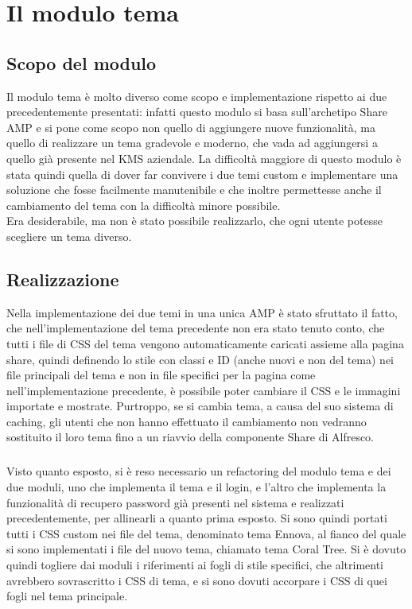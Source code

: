 
\chapter{Il modulo tema}
\label{cap:modulo-tema}

\section{Scopo del modulo}
Il modulo tema è molto diverso come scopo e implementazione rispetto ai due precedentemente presentati: infatti questo modulo si basa sull'archetipo Share AMP e si pone come scopo non quello di aggiungere nuove funzionalità, ma quello di realizzare un tema gradevole e moderno, che vada ad aggiungersi a quello già presente nel \gls{KMS} aziendale. La difficoltà maggiore di questo modulo è stata quindi quella di dover far convivere i due temi custom e implementare una soluzione che fosse facilmente manutenibile e che inoltre permettesse anche il cambiamento del tema con la difficoltà minore possibile.\\
Era desiderabile, ma non è stato possibile realizzarlo, che ogni utente potesse scegliere un tema diverso.
\section{Realizzazione}
Nella implementazione dei due temi in una unica AMP è stato sfruttato il fatto, che nell'implementazione del tema precedente non era stato tenuto conto, che tutti i file di CSS del tema vengono automaticamente caricati assieme alla pagina share, quindi definendo lo stile con classi e ID (anche nuovi e non del tema) nei file principali del tema e non in file specifici per la pagina come nell'implementazione precedente, è possibile poter cambiare il CSS e le immagini importate e mostrate.
Purtroppo, se si cambia tema, a causa del suo sistema di caching, gli utenti che non hanno effettuato il cambiamento non vedranno sostituito il loro tema fino a un riavvio della componente Share di Alfresco.
\paragraph{}Visto quanto esposto, si è reso necessario un refactoring del modulo tema e dei due moduli, uno che implementa il tema e il login, e l'altro che implementa la funzionalità di recupero password già presenti nel sistema e realizzati precedentemente, per allinearli a quanto prima esposto. Si sono quindi portati tutti i CSS custom nei file del tema, denominato tema Ennova, al fianco del quale si sono implementati i file del nuovo tema, chiamato tema Coral Tree. Si è dovuto quindi togliere dai moduli i riferimenti ai fogli di stile specifici, che altrimenti avrebbero sovrascritto i CSS di tema, e si sono dovuti accorpare i CSS di quei fogli nel tema principale.
